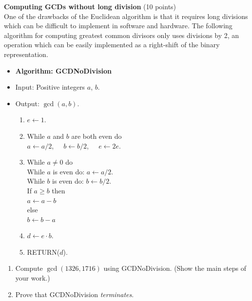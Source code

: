 \begin{problem}{\bf Computing GCDs without long division} (10 points)\\
One of the drawbacks of the Euclidean algorithm is that it requires
long divisions which can be difficult to implement in software and
hardware. The following algorithm for computing greatest common divisors
only uses divisions by 2, an operation which can be easily implemented
as a right-shift of the binary representation.
\begin{itemize}
\itemsep 0mm
\item[] {\bf Algorithm: GCDNoDivision}
\item[] Input: Positive integers $a$, $b$.
\item[] Output: $\gcd(a,b)$.
\begin{enumerate}
\itemsep 0mm
\item[(i)] $e \leftarrow 1$.
\item[(ii)] While $a$ and $b$ are both even do\\
      \hspace*{10mm} $a \leftarrow a/2$,
                     $\;\;\;\;b \leftarrow b/2$,
                     $\;\;\;\;e \leftarrow 2e$.
\item[(iii)] While $a \neq 0$ do\\
      \hspace*{10mm}While $a$ is even do: $a \leftarrow a/2$.\\
      \hspace*{10mm}While $b$ is even do: $b \leftarrow b/2$.\\
      \hspace*{10mm}If $a \geq b$ then\\
      \hspace*{20mm}$a \leftarrow a-b$\\
      \hspace*{10mm}else\\
      \hspace*{20mm}$b \leftarrow b-a$
\item[(iv)] $d \leftarrow e \cdot b$.
\item[(v)] RETURN($d$).
\end{enumerate}
\end{itemize}
\begin{enumerate}[label=(\alph*)]
\item Compute $\gcd(1326,1716)$ using GCDNoDivision.
(Show the main steps of your
work.)
\item Prove that GCDNoDivision \emph{terminates}.

\end{enumerate}
\end{problem}
